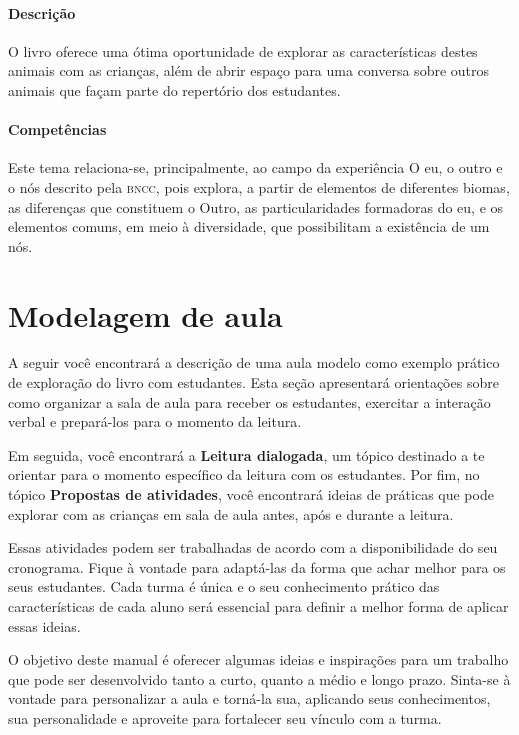 \documentclass[11pt]{extarticle}
\begin{document}
\paragraph{Descrição} O livro oferece uma ótima oportunidade de explorar 
as características destes animais com as crianças, além de abrir espaço para uma 
conversa sobre outros animais que façam parte do repertório dos estudantes. 

\paragraph{Competências} Este tema relaciona-se, principalmente, ao 
campo da experiência O eu, o outro e o nós 
descrito pela \textsc{bncc}, pois explora, a partir de elementos de diferentes biomas, as diferenças que constituem o Outro, as particularidades formadoras do eu, e os elementos comuns, em meio à diversidade, que possibilitam a existência de um nós.



\section{Modelagem de aula}
A seguir você encontrará a descrição de uma aula modelo como exemplo 
prático de exploração do livro com estudantes. Esta seção apresentará 
orientações sobre como organizar a sala de aula para receber os 
estudantes, exercitar a interação verbal e prepará-los para o 
momento da leitura.

Em seguida, você encontrará a \textbf{Leitura dialogada}, um 
tópico destinado a te orientar para o momento específico da 
leitura com os estudantes. Por fim, no tópico 
\textbf{Propostas de atividades}, você encontrará ideias 
de práticas que pode explorar com as crianças em sala de 
aula antes, após e durante a leitura. 

Essas atividades podem ser trabalhadas de acordo com a 
disponibilidade do seu cronograma. Fique à vontade para adaptá-las 
da forma que achar melhor para os seus estudantes. Cada turma é única 
e o seu conhecimento prático das características de cada aluno será 
essencial para definir a melhor forma de aplicar essas ideias. 

O objetivo deste manual é oferecer algumas ideias 
e inspirações para um trabalho que pode ser desenvolvido tanto 
a curto, quanto a médio e longo prazo. Sinta-se à vontade para 
personalizar a aula e torná-la sua, aplicando seus conhecimentos, sua 
personalidade e aproveite para fortalecer 
seu vínculo com a turma.
\end{document}

